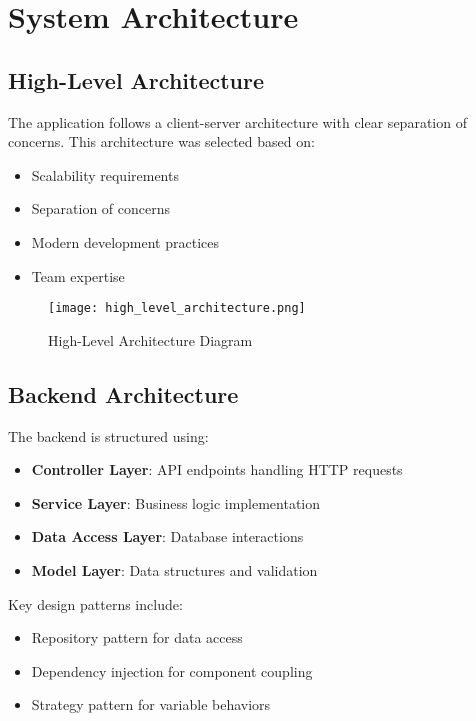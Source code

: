 \documentclass[12pt,a4paper]{article}
\begin{document}
\section{System Architecture}

\subsection{High-Level Architecture}

The application follows a client-server architecture with clear separation of concerns. This architecture was selected based on:
\begin{itemize}
    \item Scalability requirements
    \item Separation of concerns
    \item Modern development practices
    \item Team expertise
\end{itemize}

\begin{figure}[H]
\centering
\texttt{[image: high\_level\_architecture.png]}
\caption{High-Level Architecture Diagram}
\label{fig:high-level-architecture}
\end{figure}

\subsection{Backend Architecture}

The backend is structured using:
\begin{itemize}
    \item \textbf{Controller Layer}: API endpoints handling HTTP requests
    \item \textbf{Service Layer}: Business logic implementation
    \item \textbf{Data Access Layer}: Database interactions
    \item \textbf{Model Layer}: Data structures and validation
\end{itemize}

Key design patterns include:
\begin{itemize}
    \item Repository pattern for data access
    \item Dependency injection for component coupling
    \item Strategy pattern for variable behaviors
\end{itemize}
\end{document}
